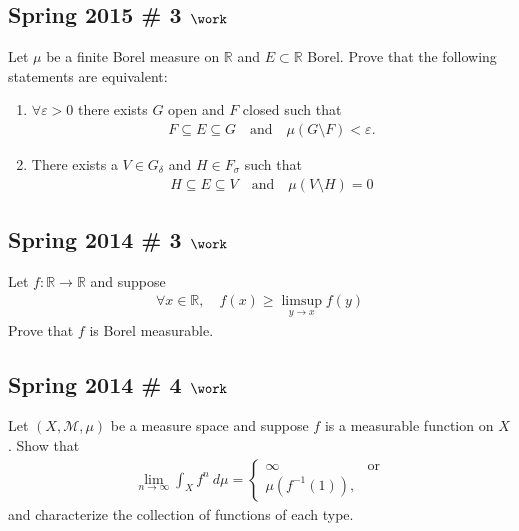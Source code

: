 \hypertarget{spring-2015-3-work}{%
\subsection{\texorpdfstring{Spring 2015 \# 3
\(\work\)}{Spring 2015 \# 3 \textbackslash work}}\label{spring-2015-3-work}}

Let \(\mu\) be a finite Borel measure on \({\mathbb{R}}\) and
\(E \subset {\mathbb{R}}\) Borel. Prove that the following statements
are equivalent:

\begin{enumerate}
\def\labelenumi{\arabic{enumi}.}
\tightlist
\item
  \(\forall \varepsilon > 0\) there exists \(G\) open and \(F\) closed
  such that
  \begin{align*}
  F \subseteq E \subseteq G \quad \text{and} \quad \mu(G\setminus F) < \varepsilon.
  \end{align*}
\item
  There exists a \(V \in G_\delta\) and \(H \in F_\sigma\) such that
  \begin{align*}
  H \subseteq E \subseteq V \quad \text{and}\quad \mu(V\setminus H) = 0
  \end{align*}
\end{enumerate}

\hypertarget{spring-2014-3-work}{%
\subsection{\texorpdfstring{Spring 2014 \# 3
\(\work\)}{Spring 2014 \# 3 \textbackslash work}}\label{spring-2014-3-work}}

Let \(f: {\mathbb{R}}\to {\mathbb{R}}\) and suppose
\begin{align*}
\forall x\in {\mathbb{R}},\quad f(x) \geq \limsup _{y \rightarrow x} f(y)
\end{align*}
Prove that \(f\) is Borel measurable.

\hypertarget{spring-2014-4-work}{%
\subsection{\texorpdfstring{Spring 2014 \# 4
\(\work\)}{Spring 2014 \# 4 \textbackslash work}}\label{spring-2014-4-work}}

Let \((X, \mathcal M, \mu)\) be a measure space and suppose \(f\) is a
measurable function on \(X\). Show that
\begin{align*}
\lim _{n \rightarrow \infty} \int_{X} f^{n} ~d \mu =
\begin{cases}
\infty & \text{or} \\
\mu(f^{-1}(1)),
\end{cases}
\end{align*}
and characterize the collection of functions of each type.

